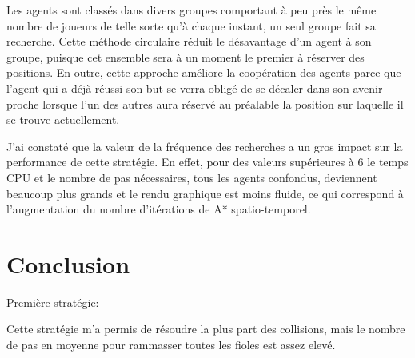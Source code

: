 \documentclass[letterpaper]{article}
\begin{document}
Les agents sont class\'es dans divers groupes comportant \`a peu pr\`es le m\^eme nombre de joueurs de telle sorte qu'\`a chaque instant, un seul groupe fait sa recherche. 
Cette m\'ethode circulaire r\'eduit le d\'esavantage d'un agent \`a son groupe, puisque cet ensemble sera \`a un moment le premier \`a r\'eserver des positions.
En outre, cette approche am\'eliore la coop\'eration des agents parce que l'agent qui a d\'ej\`a r\'eussi son but se verra oblig\'e de se d\'ecaler dans son avenir proche lorsque l'un des autres aura r\'eserv\'e au pr\'ealable la position sur laquelle il se trouve actuellement.

J'ai constat\'e que la valeur de la fr\'equence des recherches a un gros impact sur la performance de cette strat\'egie.
En effet, pour des valeurs sup\'erieures \`a 6 le temps CPU et le nombre de pas n\'ecessaires, tous les agents confondus, deviennent beaucoup plus grands et le rendu graphique est moins fluide, ce qui correspond \`a l'augmentation du nombre d'it\'erations de A* spatio-temporel.

\section{Conclusion}
Premi\`ere strat\'egie:

Cette strat\'egie m'a permis de r\'esoudre la plus part des collisions, mais le nombre de pas en moyenne pour rammasser toutes les fioles est assez elev\'e.
\end{document}

